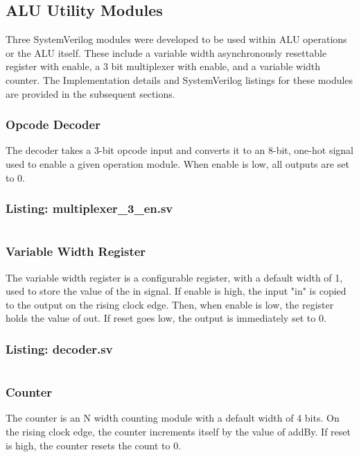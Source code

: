 \documentclass[12pt,letterpaper]{article}
\begin{document}
\subsection{ALU Utility Modules}
Three SystemVerilog modules were developed to be used within ALU operations or the ALU itself. These include a variable width
asynchronously resettable register with enable, a 3 bit multiplexer with enable, and a variable width counter. The Implementation
details and SystemVerilog listings for these modules are provided in the subsequent sections.

\subsubsection{Opcode Decoder}
The decoder takes a 3-bit opcode input and converts it to an 8-bit, one-hot signal used to enable a given operation module. 
When enable is low, all outputs are set to 0.
\subsubsection*{Listing: multiplexer\_3\_en.sv}
\inputminted[bgcolor = bggray, linenos, fontsize = \footnotesize, breaklines]{sv}{"../ALU_SystemVerilog/utility_modules/decoder.sv"}

\subsubsection{Variable Width Register}
The variable width register is a configurable register, with a default width of 1, used to store the value of the in signal. If enable is high, 
the input "in" is copied to the output on the rising clock edge. Then, when enable is low, the register holds the value of out. If reset goes 
low, the output is immediately set to 0.
\subsubsection*{Listing: decoder.sv}
\inputminted[bgcolor = bggray, linenos, fontsize = \footnotesize, breaklines]{sv}{"../ALU_SystemVerilog/utility_modules/register_en_rstn.sv"}

\subsubsection{Counter}
The counter is an N width counting module with a default width of 4 bits. On the rising clock edge, the counter increments itself by the
value of addBy. If reset is high, the counter resets the count to 0.
\end{document}
